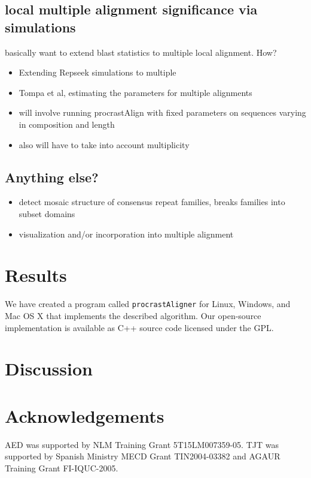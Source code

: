 \documentclass{llncs}
\begin{document}
\subsection{local multiple alignment significance via simulations}
basically want to extend blast statistics to multiple local alignment. How?
\begin{itemize}
\item Extending Repseek simulations to multiple
\item Tompa et al, estimating the parameters for multiple alignments
\item will involve running procrastAlign with fixed parameters on sequences varying in composition and length
\item also will have to take into account multiplicity
\end{itemize}

\subsection{Anything else?}
\begin{itemize}
\item detect mosaic structure of consensus repeat families, breaks
    families into subset domains
\item visualization and/or incorporation into multiple alignment 
\end{itemize}

\section{Results}
We have created a program called \texttt{procrastAligner} for Linux,
Windows, and Mac OS X that implements the described algorithm. Our
open-source implementation is available as C++ source code licensed
under the GPL.

\section{ Discussion }

\section{ Acknowledgements }
AED was supported by NLM Training Grant 5T15LM007359-05. TJT was
supported by Spanish Ministry MECD Grant TIN2004-03382 and AGAUR
Training Grant FI-IQUC-2005. 



\small

\end{document}
